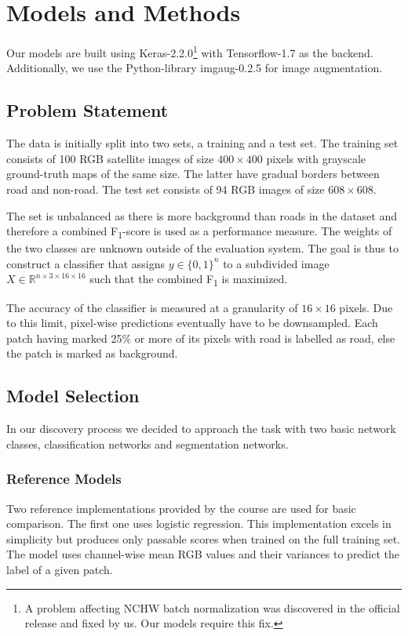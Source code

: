 \documentclass[10pt,conference,compsocconf]{IEEEtran}
\begin{document}
\section{Models and Methods}
\label{sec:models-and-methods}

Our models are built using Keras-2.2.0\footnote{A problem affecting NCHW batch normalization was discovered in the official release and fixed by us. Our models require this fix.}\cite{url:keras} with Tensorflow-1.7\cite{url:tensorflow} as the backend. Additionally, we use the Python-library imgaug-0.2.5\cite{url:imgaug} for image augmentation.

\subsection{Problem Statement}
\label{subsec:problem-statement}
The data is initially split into two sets, a training and a test set. The training set consists of 100 RGB satellite images of size $400 \times 400$ pixels with grayscale ground-truth maps of the same size. The latter have gradual borders between road and non-road. The test set consists of 94 RGB images of size $608\times 608$.

The set is unbalanced as there is more background than roads in the dataset and therefore a combined F\textsubscript{1}-score
is used as a performance measure. The weights of the two classes are unknown outside of the evaluation system. The goal is thus to construct a classifier that assigns $y \in \{0, 1\}^n$ to a subdivided image $X \in \mathbb{R}^{n\times 3\times 16\times 16}$ such that the combined F\textsubscript{1} is maximized.

The accuracy of the classifier is measured at a granularity of $16\times 16$ pixels. Due to this limit, pixel-wise predictions eventually have to be downsampled. Each patch having marked 25\% or more of its pixels with road is labelled as road, else the patch is marked as background.

\subsection{Model Selection}
\label{subsec:model-selection}

In our discovery process we decided to approach the task with two basic network classes, classification networks and segmentation networks.

\subsubsection{Reference Models}
Two reference implementations provided by the course are used for basic comparison. The first one uses logistic regression. This implementation excels in simplicity but produces only passable scores when trained on the full training set. The model uses channel-wise mean RGB values and their variances to predict the label of a given patch.
\end{document}
